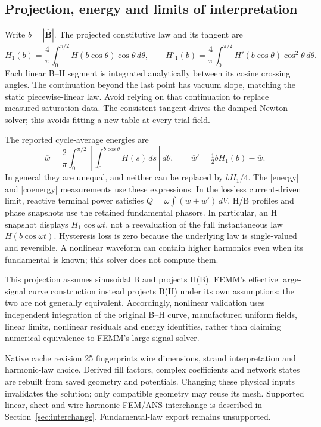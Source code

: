 \subsection{Projection, energy and limits of interpretation}
Write $b=|\widehat{\mathbf B}|$. The projected constitutive law and its tangent are
\[
 H_1(b)=\frac4\pi\int_0^{\pi/2}H(b\cos\theta)\cos\theta\,d\theta,
 \qquad
 H'_1(b)=\frac4\pi\int_0^{\pi/2}H'(b\cos\theta)\cos^2\theta\,d\theta.
\]
Each linear B--H segment is integrated analytically between its cosine crossing
angles. The continuation beyond the last point has vacuum slope, matching the
static piecewise-linear law. Avoid relying on that continuation to replace
measured saturation data. The consistent tangent drives the damped Newton
solver; this avoids fitting a new table at every trial field.

The reported cycle-average energies are
\[
 \overline w=\frac2\pi\int_0^{\pi/2}
       \left[\int_0^{b\cos\theta}H(s)\,ds\right]d\theta,
 \qquad
 \overline w'=\tfrac12 bH_1(b)-\overline w.
\]
In general they are unequal, and neither can be replaced by $bH_1/4$.
The |energy| and |coenergy| measurements use these expressions. In the lossless
current-driven limit, reactive terminal power satisfies
$Q=\omega\int(\overline w+\overline w')\,dV$.
H/B profiles and phase snapshots use the retained fundamental phasors. In
particular, an H snapshot displays $H_1\cos\omega t$, not a reevaluation of
the full instantaneous law $H(b\cos\omega t)$.
Hysteresis loss is zero because the underlying law is single-valued and
reversible. A nonlinear waveform can contain higher harmonics even when its
fundamental is known; this solver does not compute them.

This projection assumes sinusoidal B and projects H(B). FEMM's effective
large-signal curve construction instead projects B(H) under its own assumptions;
the two are not generally equivalent. Accordingly, nonlinear validation uses
independent integration of the original B--H curve, manufactured uniform fields,
linear limits, nonlinear residuals and energy identities, rather than claiming
numerical equivalence to FEMM's large-signal solver.

Native cache revision 25 fingerprints wire dimensions, strand interpretation
and harmonic-law choice. Derived fill factors, complex coefficients and network
states are rebuilt from saved geometry and potentials. Changing these physical
inputs invalidates the solution; only compatible geometry may reuse its mesh.
Supported linear, sheet and wire harmonic FEM/ANS interchange is described in
Section~\ref{sec:interchange}. Fundamental-law export remains unsupported.

